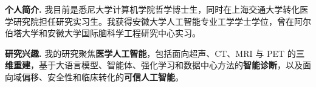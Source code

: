 \par{
{\textbf{个人简介.}} 
我目前是悉尼大学计算机学院哲学博士生，同时在上海交通大学转化医学研究院担任研究实习生。我获得安徽大学人工智能专业工学学士学位，曾在阿尔伯塔大学和安徽大学国际脑科学工程研究中心实习。

{\textbf{研究兴趣.}} 
我的研究聚焦\textbf{医学人工智能}，包括面向超声、CT、MRI 与 PET 的\textbf{三维重建}，基于大语言模型、智能体、强化学习和数据中心方法的\textbf{智能诊断}，以及面向域偏移、安全性和临床转化的\textbf{可信人工智能}。
}
